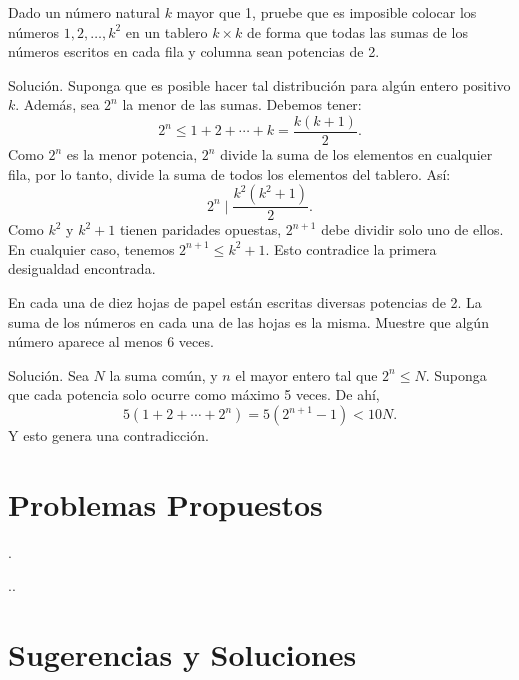 \documentclass[11pt]{scrartcl}
\begin{document}
\begin{example}[Leningrado 1989]
    Dado un número natural \(k\) mayor que 1, pruebe que es imposible colocar los números \(1, 2, \ldots, k^2\) en un tablero \(k \times k\) de forma que todas las sumas de los números escritos en cada fila y columna sean potencias de 2.
\end{example}
Solución. Suponga que es posible hacer tal distribución para algún entero positivo \(k\). Además, sea \(2^n\) la menor de las sumas. Debemos tener:
\[
2^n \leq 1 + 2 + \cdots + k = \frac{k(k+1)}{2}.
\]
Como \(2^n\) es la menor potencia, \(2^n\) divide la suma de los elementos en cualquier fila, por lo tanto, divide la suma de todos los elementos del tablero. Así:
\[
2^n \mid \frac{k^2(k^2 + 1)}{2}.
\]
Como \(k^2\) y \(k^2 + 1\) tienen paridades opuestas, \(2^{n+1}\) debe dividir solo uno de ellos. En cualquier caso, tenemos \(2^{n+1} \leq k^2 + 1\). Esto contradice la primera desigualdad encontrada.

\begin{example}
    En cada una de diez hojas de papel están escritas diversas potencias de 2. La suma de los números en cada una de las hojas es la misma. Muestre que algún número aparece al menos 6 veces.
\end{example}
Solución. Sea \(N\) la suma común, y \(n\) el mayor entero tal que \(2^n \leq N\). Suponga que cada potencia solo ocurre como máximo 5 veces. De ahí,
\[
5(1 + 2 + \cdots + 2^n) = 5(2^{n+1} - 1) < 10N.
\]
Y esto genera una contradicción.


\section{Problemas Propuestos}

\begin{problem}
.
\begin{hint}
..
\end{hint}
\end{problem}



\section{Sugerencias y Soluciones}
\begin{enumerate}

\end{enumerate}
\end{document}
